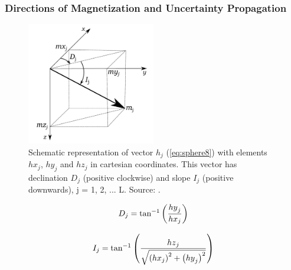 \documentclass[manuscript,revised]{geophysics}
\begin{document}
\begin{FlushRight}
\end{FlushRight}




\subsubsection{Directions of Magnetization and Uncertainty Propagation}


\begin{figure}[htbp]
\centering
\includegraphics[width=0.5\textwidth]{VECTORS.pdf}
\caption{Schematic representation of vector $h_j$ (\cref{eq:sphere8}) with elements $hx_j$, $hy_j$ and $hz_j$ in cartesian coordinates. This vector has declination $D_j$ (positive clockwise) and slope $I_j$ (positive downwards), j = 1, 2, ... L. Source: \cite{OliveiraJr.2015}.}
\label{fig:VECTORS}
\end{figure}


\begin{equation} \label{eq:sphere16}
\centering
\small D_j=\tan^{-1}{\left(\frac{{hy}_j}{{hx}_j}\right)}
\end{equation}

\begin{equation} \label{eq:sphere17}
\centering
\small I_j=\tan^{-1}{\left(\frac{{hz}_j}{\sqrt{\left({hx}_j\right)^2+\left({hy}_j\right)^2}}\right)}
\end{equation}
\end{document}

